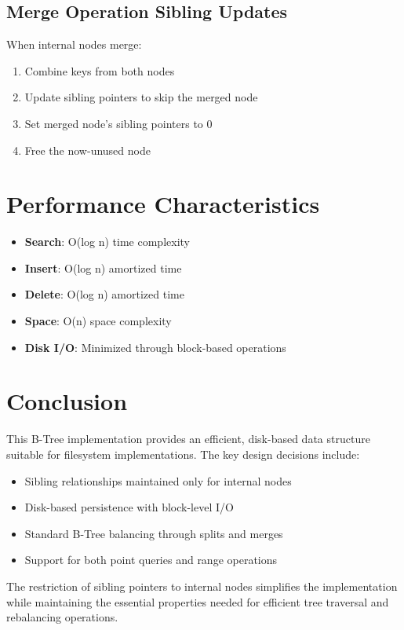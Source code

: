 \documentclass[12pt,a4paper]{article}
\begin{document}
\subsection{Merge Operation Sibling Updates}

When internal nodes merge:
\begin{enumerate}
    \item Combine keys from both nodes
    \item Update sibling pointers to skip the merged node
    \item Set merged node's sibling pointers to 0
    \item Free the now-unused node
\end{enumerate}

\section{Performance Characteristics}

\begin{itemize}
    \item \textbf{Search}: O(log n) time complexity
    \item \textbf{Insert}: O(log n) amortized time
    \item \textbf{Delete}: O(log n) amortized time
    \item \textbf{Space}: O(n) space complexity
    \item \textbf{Disk I/O}: Minimized through block-based operations
\end{itemize}

\section{Conclusion}

This B-Tree implementation provides an efficient, disk-based data structure suitable for filesystem implementations. The key design decisions include:

\begin{itemize}
    \item Sibling relationships maintained only for internal nodes
    \item Disk-based persistence with block-level I/O
    \item Standard B-Tree balancing through splits and merges
    \item Support for both point queries and range operations
\end{itemize}

The restriction of sibling pointers to internal nodes simplifies the implementation while maintaining the essential properties needed for efficient tree traversal and rebalancing operations.
\end{document}
